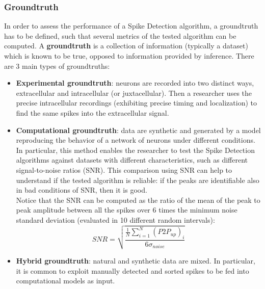 \subsubsection{Groundtruth}
In order to assess the performance of a Spike Detection algorithm, a groundtruth has to
be defined, such that several metrics of the tested algorithm can be computed.
A \textbf{groundtruth} is a collection of information (typically a dataset)
which is known to be true, opposed to information provided by inference.
There are 3 main types of groundtruths:
\begin{itemize}
    \item \textbf{Experimental groundtruth}: neurons are recorded into two distinct ways,
          extracellular and intracellular (or juxtacellular). Then a researcher uses the
          precise intracellular recordings (exhibiting precise timing and localization) to find
          the same spikes into the extracellular signal.
    \item \textbf{Computational groundtruth}: data are synthetic and generated by a model
          reproducing the behavior of a network of neurons under different conditions.\\
          In particular, this method enables the researcher to test the Spike Detection
          algorithms against datasets with different characteristics, such as different
          signal-to-noise ratios (SNR). This comparison using SNR can help to understand if
          the tested algorithm is reliable: if the peaks are identifiable also in bad
          conditions of SNR, then it is good.\\
          Notice that the SNR can be computed as the ratio of the mean of the peak to peak
          amplitude between all the spikes over 6 times the minimum noise standard deviation
          (evaluated in 10 different random intervals):
          \begin{equation*}
              SNR = \sqrt{\frac{\frac{1}{N}\sum_{i=1}^N(P2P_{up})_i}{6\sigma_{noise}}}
          \end{equation*}
    \item \textbf{Hybrid groundtruth}: natural and synthetic data are mixed.
          In particular, it is common to exploit manually detected and sorted spikes to be
          fed into computational models as input.
\end{itemize}

